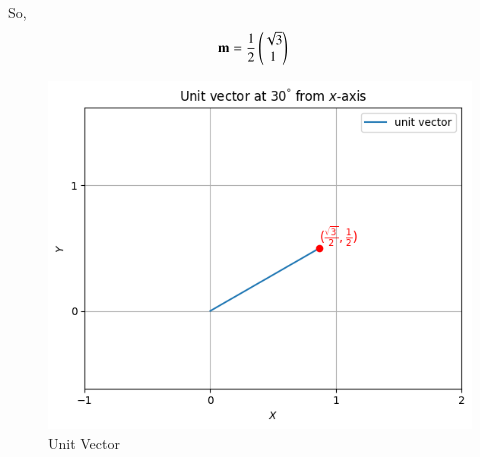 \documentclass[journal]{IEEEtran}
\begin{document}
	So,
	\begin{align}
		\mathbf{m} &= \frac{1}{2} \begin{pmatrix}\sqrt{3} \\ 1\end{pmatrix}
	\end{align}


	\begin{figure}[H]
		\centering
		\includegraphics[width=\textwidth]{plots/plot.png}
		\caption{Unit Vector}
	\end{figure}


  
\end{document}
